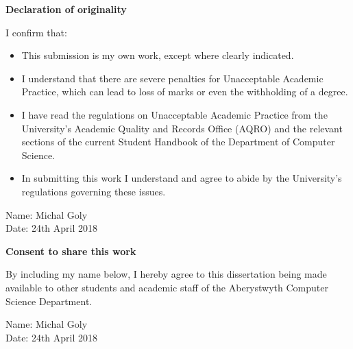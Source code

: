 \thispagestyle{empty}

\begin{center}
    {\LARGE\bf Declaration of originality}
\end{center}

I confirm that:

\begin{itemize}
\item{This submission is my own work, except where
clearly indicated.}

\item{I understand that there are severe penalties for Unacceptable Academic Practice, which can lead to loss of marks or even the withholding of a degree.}

\item{I have read the regulations on Unacceptable Academic Practice from the University's Academic Quality and Records Office (AQRO) and the relevant sections of the current Student Handbook of the Department of Computer Science.}

\item{In submitting this work I understand and agree to abide by the University's regulations governing these issues.}
\end{itemize}

\vspace{2em}
Name: Michal Goly  \\

\vspace{1em}
Date: 24th April 2018 \\

\vspace{1em}
\begin{center}
    {\LARGE\bf Consent to share this work}
\end{center}

By including my name below, I hereby agree to this dissertation being made available to other students and academic staff of the Aberystwyth Computer Science Department.

\vspace{2em}
Name: Michal Goly  \\

\vspace{1em}
Date: 24th April 2018 \\
